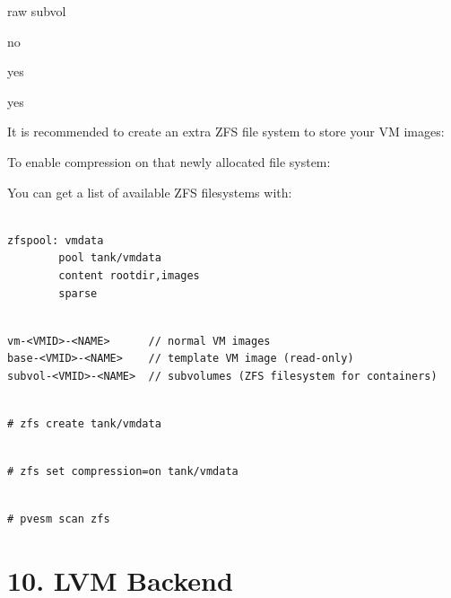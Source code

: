raw subvol

no

yes

yes

It is recommended to create an extra ZFS file system to store your VM images:

To enable compression on that newly allocated file system:

You can get a list of available ZFS filesystems with:

\begin{lstlisting}

zfspool: vmdata
        pool tank/vmdata
        content rootdir,images
        sparse

\end{lstlisting}

\begin{lstlisting}

vm-<VMID>-<NAME>      // normal VM images
base-<VMID>-<NAME>    // template VM image (read-only)
subvol-<VMID>-<NAME>  // subvolumes (ZFS filesystem for containers)

\end{lstlisting}

\begin{lstlisting}

# zfs create tank/vmdata

\end{lstlisting}

\begin{lstlisting}

# zfs set compression=on tank/vmdata

\end{lstlisting}

\begin{lstlisting}

# pvesm scan zfs

\end{lstlisting}

\begin{table}[htbp]

\centering

\begin{tabular}

\end{tabular}

\end{table}


\section{10. LVM Backend}

